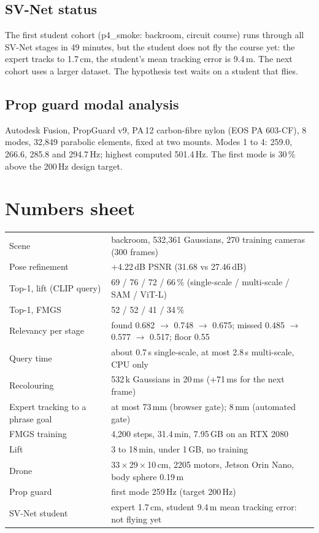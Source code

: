 \documentclass[11pt,a4paper]{article}
\begin{document}
\subsection{SV-Net status}
The first student cohort (p4\_smoke: backroom, circuit course) runs through all SV-Net stages in 49
minutes, but the student does not fly the course yet: the expert tracks to 1.7\,cm, the student's mean
tracking error is 9.4\,m. The next cohort uses a larger dataset. The hypothesis test waits on a student
that flies.

\subsection{Prop guard modal analysis}
Autodesk Fusion, PropGuard v9, PA\,12 carbon-fibre nylon (EOS PA 603-CF), 8 modes, 32{,}849 parabolic
elements, fixed at two mounts. Modes 1 to 4: 259.0, 266.6, 285.8 and 294.7\,Hz; highest computed 501.4\,Hz.
The first mode is 30\,\% above the 200\,Hz design target.

\section{Numbers sheet}\label{sec:nums}
\begin{center}\small
\begin{tabularx}{\linewidth}{@{}lX@{}}
\toprule
Scene & backroom, 532{,}361 Gaussians, 270 training cameras (300 frames) \\
Pose refinement & +4.22\,dB PSNR (31.68 vs 27.46\,dB) \\
Top-1, lift (CLIP query) & 69 / 76 / 72 / 66\,\% (single-scale / multi-scale / SAM / ViT-L) \\
Top-1, FMGS & 52 / 52 / 41 / 34\,\% \\
Relevancy per stage & found 0.682 $\to$ 0.748 $\to$ 0.675; missed 0.485 $\to$ 0.577 $\to$ 0.517; floor 0.55 \\
Query time & about 0.7\,s single-scale, at most 2.8\,s multi-scale, CPU only \\
Recolouring & 532\,k Gaussians in 20\,ms (+71\,ms for the next frame) \\
Expert tracking to a phrase goal & at most 73\,mm (browser gate); 8\,mm (automated gate) \\
FMGS training & 4{,}200 steps, 31.4\,min, 7.95\,GB on an RTX 2080 \\
Lift & 3 to 18\,min, under 1\,GB, no training \\
Drone & 33\,$\times$\,29\,$\times$\,10\,cm, 2205 motors, Jetson Orin Nano, body sphere 0.19\,m \\
Prop guard & first mode 259\,Hz (target 200\,Hz) \\
SV-Net student & expert 1.7\,cm, student 9.4\,m mean tracking error: not flying yet \\
\bottomrule
\end{tabularx}
\end{center}
\end{document}
